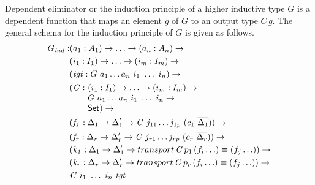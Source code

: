 \documentclass[sigplan,10pt]{acmart}
\begin{document}
Dependent eliminator or the induction principle of a higher inductive type $G$ is a dependent function that maps an element $g$ of $G$ to an output type $C \, g$. The general schema for the induction principle of $G$ is given as follows.
\begin{align*}
G_{\mathit{ind}} : & (a_1 : A_1) \to \ldots \to (a_n : A_n) \to\\
& (i_1 : I_1) \to \ldots \to (i_m : I_m) \to\\
& (\mathit{tgt} : G\ a_1 \ldots a_n\ i_1\ \ldots\ i_n) \to\\
& \begin{array}{@{}l@{}l}(\mathit{C} :\ & (i_1 : I_1) \to \ldots \to (i_m : I_m) \to\\  & G\ a_1 \ldots a_n\ i_1\ \ldots\ i_n \to\\ &\SET{})\to\end{array} \\
& (\mathit{f_1} : \Delta_1 \to  \Delta_1^\prime \to \mathit{C}\ j_{11} \ldots j_{1p}\ (c_1\ \overline{\Delta_1})) \to \\
& (\mathit{f_r} : \Delta_r \to  \Delta_r^\prime \to \mathit{C}\ j_{r1} \ldots j_{rp}\ (c_r\ \overline{\Delta_r})) \to \\
& (\mathit{k_1} : \Delta_1 \to  \Delta_1^\prime \to transport \, \mathit{C} \, p_1 \, (f_i \ldots) \equiv (f_j \ldots)) \to \\
& (\mathit{k_r} : \Delta_r \to  \Delta_r^\prime \to transport \, \mathit{C} \, p_r \, (f_i \ldots) \equiv (f_j \ldots)) \to \\
& \mathit{C}\ i_1\ \ldots\ i_n\ \mathit{tgt}
\end{align*}
\end{document}
